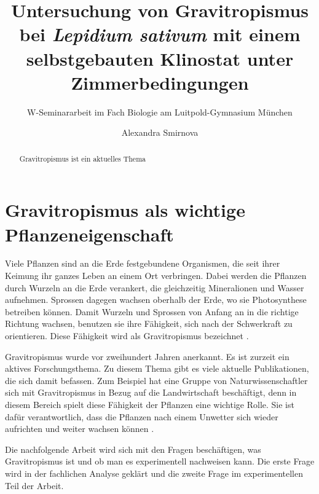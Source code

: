 \documentclass[
a4paper, 
11pt, 
ngerman,
listof=totoc,
bibliography=totocnumbered,
abstracton
]{scrreprt}
\title{Untersuchung von Gravitropismus bei \emph{Lepidium sativum} mit einem selbstgebauten Klinostat unter Zimmerbedingungen}
\subtitle{W-Seminararbeit im Fach Biologie am Luitpold-Gymnasium München}
\author{Alexandra Smirnova}
\begin{document}
	
\begingroup
\renewcommand*{\chapterpagestyle}{empty}
\pagestyle{empty}
\maketitle
\tableofcontents
\clearpage
\endgroup
	
\renewcommand\abstractname{Abstract}
\begin{abstract}

Gravitropismus ist ein aktuelles Thema
	
\end{abstract}


\chapter{Gravitropismus als wichtige Pflanzeneigenschaft}

Viele Pflanzen sind an die Erde festgebundene Organismen, die seit ihrer Keimung ihr ganzes Leben an einem Ort verbringen. Dabei werden die Pflanzen durch Wurzeln an die Erde verankert, die gleichzeitig Mineralionen und Wasser aufnehmen. Sprossen dagegen wachsen oberhalb der Erde, wo sie Photosynthese betreiben können. Damit Wurzeln und Sprossen von Anfang an in die richtige Richtung wachsen, benutzen sie ihre Fähigkeit, sich nach der Schwerkraft zu orientieren. Diese Fähigkeit wird als Gravitropismus bezeichnet  \parencite[2]{Masson2002}. 

Gravitropismus wurde vor zweihundert Jahren anerkannt. 
Es ist zurzeit ein aktives Forschungsthema. Zu diesem Thema gibt es viele aktuelle Publikationen, die sich damit befassen. Zum Beispiel hat eine Gruppe von Naturwissenschaftler sich mit Gravitropismus in Bezug auf die Landwirtschaft beschäftigt, denn in diesem Bereich spielt diese Fähigkeit der Pflanzen eine wichtige Rolle. Sie ist dafür verantwortlich, dass die Pflanzen nach einem Unwetter sich wieder aufrichten und weiter wachsen können \parencite[343]{Chen1999}.

Die nachfolgende Arbeit wird sich mit den Fragen beschäftigen, was Gravitropismus ist und ob man es experimentell nachweisen kann. Die erste Frage wird in der fachlichen Analyse geklärt und die zweite Frage im experimentellen Teil der Arbeit.
\end{document}
